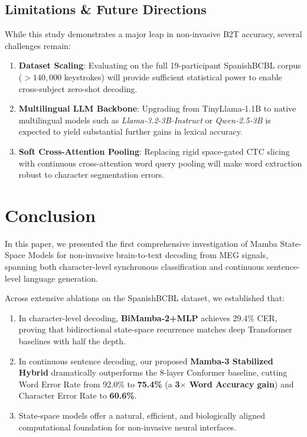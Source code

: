 \documentclass[conference]{IEEEtran}
\begin{document}
\subsection{Limitations \& Future Directions}
While this study demonstrates a major leap in non-invasive B2T accuracy, several challenges remain:
\begin{enumerate}
    \item \textbf{Dataset Scaling}: Evaluating on the full 19-participant SpanishBCBL corpus ($>140,000$ keystrokes) will provide sufficient statistical power to enable cross-subject zero-shot decoding.
    \item \textbf{Multilingual LLM Backbone}: Upgrading from TinyLlama-1.1B to native multilingual models such as \textit{Llama-3.2-3B-Instruct} or \textit{Qwen-2.5-3B} is expected to yield substantial further gains in lexical accuracy.
    \item \textbf{Soft Cross-Attention Pooling}: Replacing rigid space-gated CTC slicing with continuous cross-attention word query pooling will make word extraction robust to character segmentation errors.
\end{enumerate}

\section{Conclusion}
\label{sec:conclusion}

In this paper, we presented the first comprehensive investigation of Mamba State-Space Models for non-invasive brain-to-text decoding from MEG signals, spanning both character-level synchronous classification and continuous sentence-level language generation. 

Across extensive ablations on the SpanishBCBL dataset, we established that:
\begin{enumerate}
    \item In character-level decoding, \textbf{BiMamba-2+MLP} achieves 29.4\% CER, proving that bidirectional state-space recurrence matches deep Transformer baselines with half the depth.
    \item In continuous sentence decoding, our proposed \textbf{Mamba-3 Stabilized Hybrid} dramatically outperforms the 8-layer Conformer baseline, cutting Word Error Rate from 92.0\% to \textbf{75.4\%} (a \textbf{3$\times$ Word Accuracy gain}) and Character Error Rate to \textbf{60.6\%}.
    \item State-space models offer a natural, efficient, and biologically aligned computational foundation for non-invasive neural interfaces.
\end{enumerate}
\end{document}
